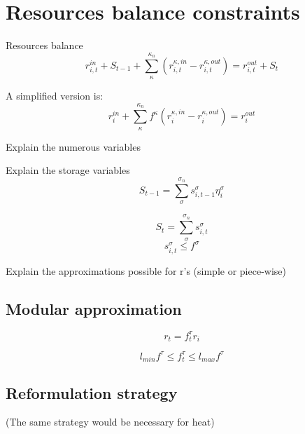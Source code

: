\documentclass[10pt,twoside,a4paper]{report}
\begin{document}

\section{Resources balance constraints}

Resources balance 
\begin{equation}
  \label{eq:resources}
  r_{i,t}^{in}+S_{t-1}+\sum_\kappa^{\kappa_n} (r_{i,t}^{\kappa,in}-r_{i,t}^{\kappa,out}) = r_{i,t}^{out}+S_t
\end{equation}


A simplified version is:
\begin{equation}
  \label{eq:resources}
  r_{i}^{in}+\sum_\kappa^{\kappa_n} f^\kappa(r_{i}^{\kappa,in}-r_{i}^{\kappa,out}) = r_{i}^{out}
\end{equation}




Explain the numerous variables

Explain the storage variables
\begin{equation}
  S_{t-1} = \sum_\sigma^{\sigma_n}s_{i,t-1}^\sigma\eta_i^\sigma
\end{equation}


\begin{equation}
  S_{t} = \sum_\sigma^{\sigma_n}s_{i,t}^\sigma
\end{equation}
\begin{equation}
  s_{i,t}^\sigma \leq f^\sigma
\end{equation}


Explain the approximations possible for r's (simple or piece-wise)

\subsection{Modular approximation}
\begin{equation}
  r_t = f_t^\tau r_i
\end{equation}

\begin{equation}
  l_{min}f^\tau \leq f_t^\tau \leq l_{max}f^\tau 
\end{equation}

\subsection{Reformulation strategy}
(The same strategy would be necessary for heat)
\end{document}
